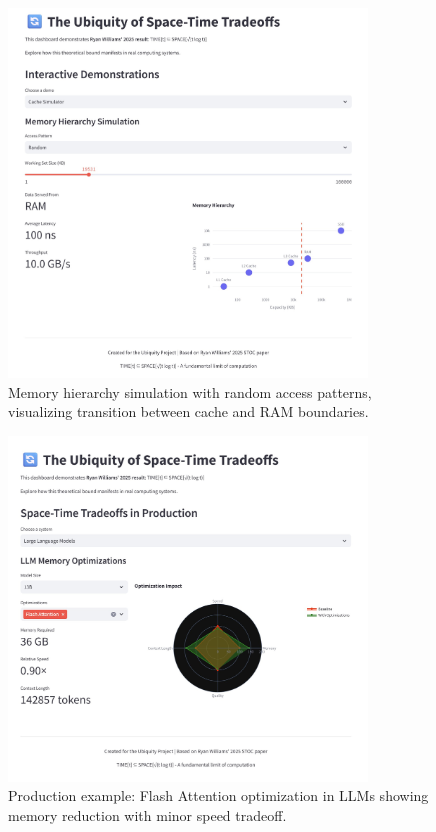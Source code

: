 \documentclass[11pt]{article}
\theoremstyle{definition}
\begin{document}
\begin{figure}[!htbp]
\centering
\includegraphics[width=0.85\textwidth]{figures/dashboard2.png}
\caption{Memory hierarchy simulation with random access patterns, visualizing transition between cache and RAM boundaries.}
\label{fig:hierarchy_dashboard}
\end{figure}

\begin{figure}[!htbp]
\centering
\includegraphics[width=0.85\textwidth]{figures/dashboard3.png}
\caption{Production example: Flash Attention optimization in LLMs showing memory reduction with minor speed tradeoff.}
\label{fig:llm_dashboard}
\end{figure}
\end{document}
